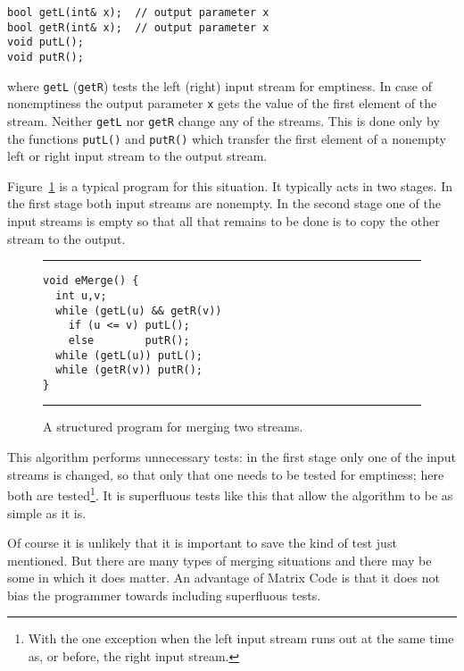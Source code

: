 \documentclass[preprint,11pt]{elsarticle}
\begin{document}
\begin{verbatim}
bool getL(int& x);  // output parameter x
bool getR(int& x);  // output parameter x
void putL();
void putR();
\end{verbatim}
where {\tt getL} ({\tt getR})
tests the left (right) input stream for emptiness.
In case of nonemptiness the output parameter
{\tt x} gets the value of the first element
of the stream.
Neither {\tt getL} nor {\tt getR} change
any of the streams.
This is done only by the functions
{\tt putL()} and
{\tt putR()}
which transfer the first element of a nonempty
left or right input stream to the output stream.

Figure~\ref{fig:eMerge}
is a typical program for this situation.
It typically acts in two stages.
In the first stage both input streams are nonempty.
In the second stage one of the input streams is empty
so that all that remains to be done
is to copy the other stream to the output.

\begin{figure}[htbp]
\hrule \vspace{0.1in}
\begin{center}
\begin{minipage}[t]{2.5in}
\begin{verbatim}
void eMerge() {
  int u,v;
  while (getL(u) && getR(v))
    if (u <= v) putL();
    else        putR();
  while (getL(u)) putL();
  while (getR(v)) putR();
}
\end{verbatim}
\end{minipage}
\end{center}
\caption{\label{fig:eMerge}
A structured program for merging two streams.
}
\vspace{0.1in}
\hrule
\end{figure}

This algorithm performs unnecessary tests:
in the first stage only one of the
input streams is changed, so that only that
one needs to be tested for emptiness;
here both are tested\footnote{
With the one exception when the left input
stream runs out at the same time as, or before,
the right input stream.
}.
It is superfluous tests like this
that allow the algorithm to be as simple as it is.

Of course it is unlikely that it is important
to save the kind of test just mentioned.
But there are many types of merging situations
and there may be some in which it does matter.
An advantage of Matrix Code is that 
it does not bias the programmer
towards including superfluous tests.
\end{document}
